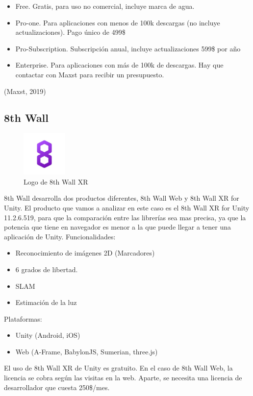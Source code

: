 \begin{itemize}
\item Free. Gratis, para uso no comercial, incluye marca de agua.
\item Pro-one. Para aplicaciones con menos de 100k descargas (no incluye actualizaciones). Pago único de 499\$ 
\item Pro-Subscription. Subscripción anual, incluye actualizaciones 599\$ por año
\item Enterprise. Para aplicaciones con más de 100k de descargas. Hay que contactar con Maxst para recibir un presupuesto.
\end{itemize}
(Maxst, 2019)

\subsection{8th Wall}
\begin{figure}[H]
    \centering
    \includegraphics[width=0.2\textwidth]{Images/8thWall_Logo.jpeg}
    \caption{Logo de 8th Wall XR}
    \label{fig:my_label}
\end{figure}

8th Wall desarrolla dos productos diferentes, 8th Wall Web y 8th Wall XR for Unity. El producto que vamos a analizar en este caso es el 8th Wall XR for Unity 11.2.6.519, para que la comparación entre las librerías sea mas precisa, ya que la potencia que tiene en navegador es menor a la que puede llegar a tener una aplicación de Unity. 
Funcionalidades:
\begin{itemize}
\item Reconocimiento de imágenes 2D (Marcadores)
\item 6 grados de libertad.
\item SLAM
\item Estimación de la luz
\end{itemize}

Plataformas:
\begin{itemize}
\item Unity (Android, iOS)
\item Web (A-Frame, BabylonJS, Sumerian, three.js)
\end{itemize}
El uso de 8th Wall XR de Unity es gratuito. En el caso de 8th Wall Web, la licencia se cobra según las visitas en la web. Aparte, se necesita una licencia de desarrollador que cuesta 250\$/mes.\\

